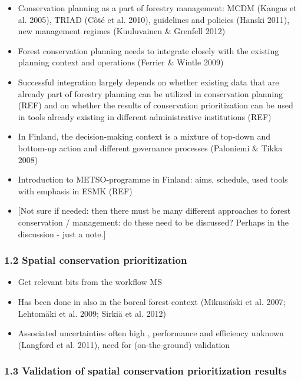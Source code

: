 \documentclass[]{article}
\begin{document}
\begin{itemize}
\itemsep1pt\parskip0pt
\item
  Conservation planning as a part of forestry management: MCDM (Kangas
  et al. 2005), TRIAD (Côté et al. 2010), guidelines and policies
  (Hanski 2011), new management regimes (Kuuluvainen \& Grenfell 2012)
\item
  Forest conservation planning needs to integrate closely with the
  existing planning context and operations (Ferrier \& Wintle 2009)
\item
  Successful integration largely depends on whether existing data that
  are already part of forestry planning can be utilized in conservation
  planning (REF) and on whether the results of conservation
  prioritization can be used in tools already existing in different
  administrative institutions (REF)
\item
  In Finland, the decision-making context is a mixture of top-down and
  bottom-up action and different governance processes (Paloniemi \&
  Tikka 2008)
\item
  Introduction to METSO-programme in Finland: aims, schedule, used tools
  with emphasis in ESMK (REF)
\item
  {[}Not sure if needed: then there must be many different approaches to
  forest conservation / management: do these need to be discussed?
  Perhaps in the discussion - just a note.{]}
\end{itemize}

\subsubsection{1.2 Spatial conservation prioritization}

\begin{itemize}
\itemsep1pt\parskip0pt
\item
  Get relevant bits from the workflow MS
\item
  Has been done in also in the boreal forest context (Mikusiński et al.
  2007; Lehtomäki et al. 2009; Sirkiä et al. 2012)⁠
\item
  Associated uncertainties often high , performance and efficiency
  unknown (Langford et al. 2011), need for (on-the-ground) validation
\end{itemize}

\subsubsection{1.3 Validation of spatial conservation prioritization
results}
\end{document}
